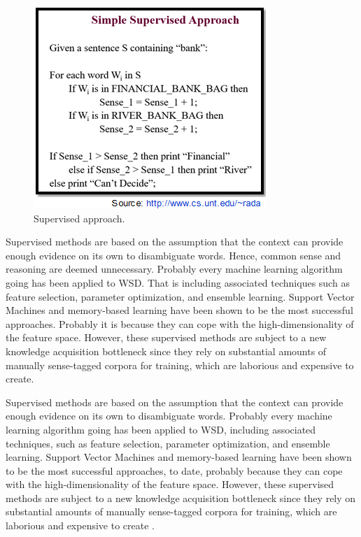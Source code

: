 \begin{figure}[tbh]
	\begin{center}
		\includegraphics[width=\columnwidth]{Union_Background_Chart_sup3}
	\end{center}
	\caption{Supervised approach.}
\end{figure}
Supervised methods are based on the assumption that the context can provide enough evidence on its own to disambiguate words. 
Hence, common sense and reasoning are deemed unnecessary. 
Probably every machine learning algorithm going has been applied to WSD. 
That is including associated techniques such as feature selection, parameter optimization, and ensemble learning. 
Support Vector Machines and memory-based learning have been shown to be the most successful approaches. 
Probably it is because they can cope with the high-dimensionality of the feature space. 
However, these supervised methods are subject to a new knowledge acquisition bottleneck since they rely on substantial amounts of manually sense-tagged corpora for training, which are laborious and expensive to create.

Supervised methods are based on the assumption that the context can provide enough evidence on its own to disambiguate words. Probably every machine learning algorithm going has been applied to WSD, including associated techniques, such as feature selection, parameter optimization, and ensemble learning. Support Vector Machines and memory-based learning have been shown to be the most successful approaches, to date, probably because they can cope with the high-dimensionality of the feature space. However, these supervised methods are subject to a new knowledge acquisition bottleneck since they rely on substantial amounts of manually sense-tagged corpora for training, which are laborious and expensive to create \cite{aramossoto2016onthe}.

